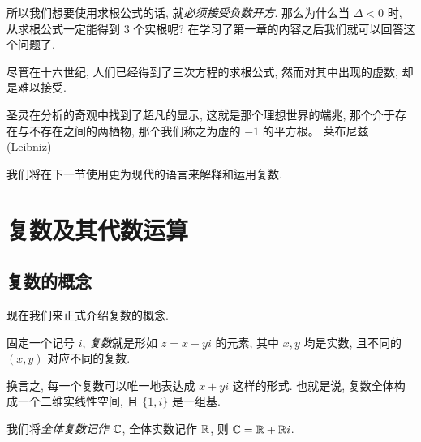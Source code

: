 \documentclass[xcolor={table}]{ctexbook}
\makeatletter
\newenvironment{quote@*}{\begin{tcolorbox}[exampstyle,notitle,fontupper=\itshape,fontlower=\itshape,halign lower=flush right,lower separated=true,indent]}{\end{tcolorbox}}
\makeatother
\begin{document}
所以我们想要使用求根公式的话, 就\emph{必须接受负数开方}.
那么为什么当 $\Delta<0$ 时, 从求根公式一定能得到 $3$ 个实根呢?
在学习了第一章的内容之后我们就可以回答这个问题了.

尽管在十六世纪, 人们已经得到了三次方程的求根公式, 然而对其中出现的虚数, 却是难以接受.

\begin{quote@*}
	圣灵在分析的奇观中找到了超凡的显示, 这就是那个理想世界的端兆, 那个介于存在与不存在之间的两栖物, 那个我们称之为虚的 $-1$ 的平方根。
\tcblower
莱布尼兹 (Leibniz)
\end{quote@*}

我们将在下一节使用更为现代的语言来解释和运用复数.

\section{复数及其代数运算}

\subsection{复数的概念}

现在我们来正式介绍复数的概念.
\begin{definition}
	固定一个记号 $i$, \emph{复数}就是形如 $z=x+yi$ 的元素, 其中 $x,y$ 均是实数, 且不同的 $(x,y)$ 对应不同的复数.
\end{definition}
换言之, 每一个复数可以唯一地表达成 $x+yi$ 这样的形式.
也就是说, 复数全体构成一个二维实线性空间, 且 $\{1,i\}$ 是一组基.

我们将\emph{全体复数记作 ${\mathbb{C}}$}, 全体实数记作 ${\mathbb{R}}$, 则 ${\mathbb{C}}={\mathbb{R}}+{\mathbb{R}} i$.
\end{document}
